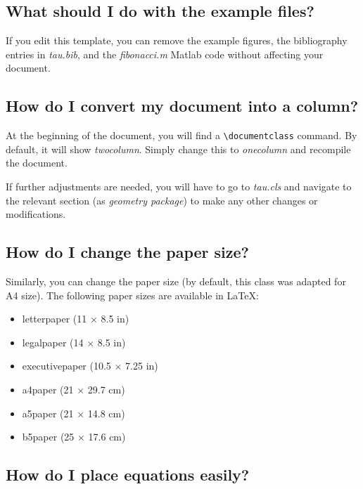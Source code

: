 \documentclass[9pt,a4paper,twocolumn,twoside]{tau-class/tau}
\begin{document}
    \subsection*{What should I do with the example files?}

        If you edit this template, you can remove the example figures, the bibliography entries in \textit{tau.bib}, and the \textit{fibonacci.m} Matlab code without affecting your document.

    \subsection*{How do I convert my document into a column?}

        At the beginning of the document, you will find a \verb|\documentclass| command. By default, it will show \textit{twocolumn}. Simply change this to \textit{onecolumn} and recompile the document. 
        
        If further adjustments are needed, you will have to go to \textit{tau.cls} and navigate to the relevant section (as \textit{geometry package}) to make any other changes or modifications.

    \subsection*{How do I change the paper size?}

        Similarly, you can change the paper size (by default, this class was adapted for A4 size). The following paper sizes are available in \LaTeX:

        \begin{itemize}
            \item letterpaper (11 $\times$ 8.5 in)
            \item legalpaper (14 $\times$ 8.5 in)
            \item executivepaper (10.5 $\times$ 7.25 in)
            \item a4paper (21 $\times$ 29.7 cm)
            \item a5paper (21 $\times$ 14.8 cm)
            \item b5paper (25 $\times$ 17.6 cm)
       \end{itemize}

    \subsection*{How do I place equations easily?}
\end{document}
